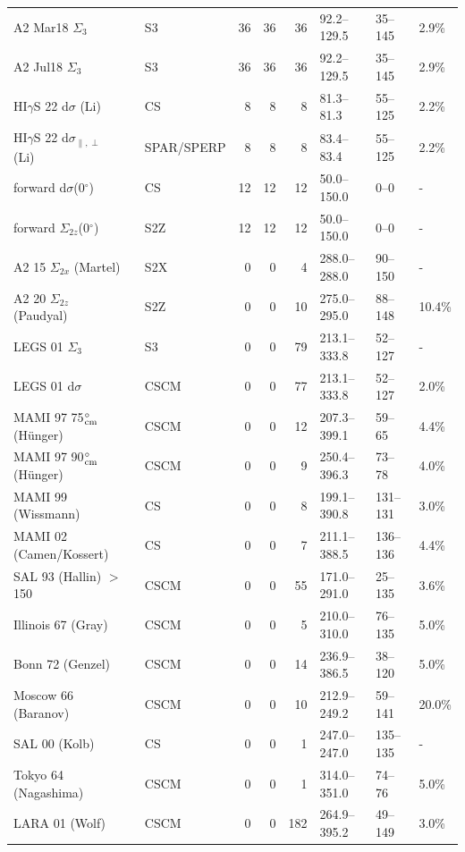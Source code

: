 \begin{tabular}{llrrrlll}
A2 Mar18 $\Sigma_{3}$~\cite{Mornacchi thesis} & S3 & 36 & 36 & 36 & 92.2--129.5 & 35--145 & 2.9\% \\
A2 Jul18 $\Sigma_{3}$~\cite{Mornacchi thesis} & S3 & 36 & 36 & 36 & 92.2--129.5 & 35--145 & 2.9\% \\
HI$\gamma$S 22 d$\sigma$ (Li)~\cite{Li:2022vnz} & CS & 8 & 8 & 8 & 81.3--81.3 & 55--125 & 2.2\% \\
HI$\gamma$S 22 d$\sigma_{\parallel,\perp}$ (Li)~\cite{Li:2022vnz} & SPAR/SPERP & 8 & 8 & 8 & 83.4--83.4 & 55--125 & 2.2\% \\
forward d$\sigma$(0$^\circ$)~\cite{Gryniuk:2015eza,Gryniuk:2016gnm} & CS & 12 & 12 & 12 & 50.0--150.0 & 0--0 & - \\
forward $\Sigma_{2z}$(0$^\circ$)~\cite{Gryniuk:2016gnm} & S2Z & 12 & 12 & 12 & 50.0--150.0 & 0--0 & - \\
A2 15 $\Sigma_{2x}$ (Martel)~\cite{A2:2014iky} & S2X & 0 & 0 & 4 & 288.0--288.0 & 90--150 & - \\
A2 20 $\Sigma_{2z}$ (Paudyal)~\cite{A2:2019bqm} & S2Z & 0 & 0 & 10 & 275.0--295.0 & 88--148 & 10.4\% \\
LEGS 01 $\Sigma_{3}$~\cite{Blanpied:2001ae} & S3 & 0 & 0 & 79 & 213.1--333.8 & 52--127 & - \\
LEGS 01 d$\sigma$~\cite{Blanpied:2001ae} & CSCM & 0 & 0 & 77 & 213.1--333.8 & 52--127 & 2.0\% \\
MAMI 97 75$^\circ_{\rm cm}$ (H\"unger)~\cite{Hunger:1997pt} & CSCM & 0 & 0 & 12 & 207.3--399.1 & 59--65 & 4.4\% \\
MAMI 97 90$^\circ_{\rm cm}$ (H\"unger)~\cite{Hunger:1997pt} & CSCM & 0 & 0 & 9 & 250.4--396.3 & 73--78 & 4.0\% \\
MAMI 99 (Wissmann)~\cite{Wissmann:1999vi} & CS & 0 & 0 & 8 & 199.1--390.8 & 131--131 & 3.0\% \\
MAMI 02 (Camen/Kossert)~\cite{Camen:2001st,Kossert:2002ws} & CS & 0 & 0 & 7 & 211.1--388.5 & 136--136 & 4.4\% \\
SAL 93 (Hallin) $>$150~\cite{Hallin:1993ft} & CSCM & 0 & 0 & 55 & 171.0--291.0 & 25--135 & 3.6\% \\
Illinois 67 (Gray)~\cite{Gray:1967zzd} & CSCM & 0 & 0 & 5 & 210.0--310.0 & 76--135 & 5.0\% \\
Bonn 72 (Genzel)~\cite{Genzel:1972ba} & CSCM & 0 & 0 & 14 & 236.9--386.5 & 38--120 & 5.0\% \\
Moscow 66 (Baranov)~\cite{Baranov:1966aaa} & CSCM & 0 & 0 & 10 & 212.9--249.2 & 59--141 & 20.0\% \\
SAL 00 (Kolb)~\cite{Kolb:2000ix} & CS & 0 & 0 & 1 & 247.0--247.0 & 135--135 & - \\
Tokyo 64 (Nagashima)~\cite{Nagashima:1964zz} & CSCM & 0 & 0 & 1 & 314.0--351.0 & 74--76 & 5.0\% \\
LARA 01 (Wolf)~\cite{Wolf:2001ha} & CSCM & 0 & 0 & 182 & 264.9--395.2 & 49--149 & 3.0\% \\
\hline
\end{tabular}
